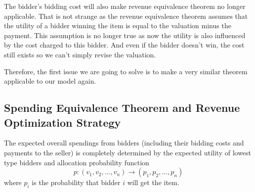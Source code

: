 %

The bidder's bidding cost will also make revenue equivalence theorem no longer
applicable.  That is not strange as the revenue equivalence theorem assumes
that the utility of a bidder winning the item is equal to the valuation minus
the payment. This assumption is no longer true as now the utility is also
influenced by the cost charged to this bidder. And even if the bidder doesn't
win, the cost still exists so we can't simply revise the valuation.

Therefore, the first issue we are going to solve is to make a very similar
theorem applicable to our model again. 

\subsection{Spending Equivalence Theorem and Revenue Optimization Strategy}

\begin{theorem}\label{theorem:equivalence}

The expected overall spendings from bidders (including their bidding costs and
payments to the seller) is completely determined by the expected utility of
lowest type bidders and allocation probability function
$$p: (v_1, v_2, \ldots, v_n) \rightarrow (p_1, p_2, \ldots, p_n)$$ 
where $p_i$ is the probability that bidder $i$ will get the item.

\end{theorem}

